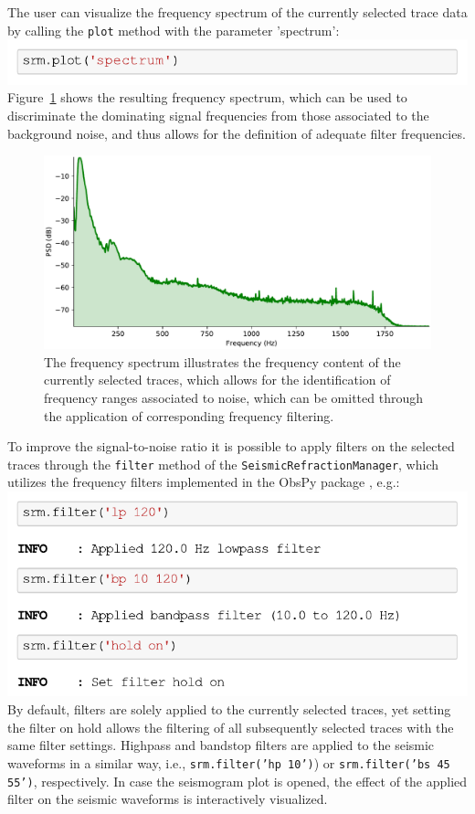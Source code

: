 \documentclass[a4paper,fleqn]{cas-sc}
\begin{document}
The user can visualize the frequency spectrum of the currently selected trace data by calling the \texttt{plot} method with the parameter 'spectrum':
\newline
\includegraphics[width=.5\textwidth]{./figures/plot_spectrum.pdf}
\newline
Figure~\ref{fig:spectrum} shows the resulting frequency spectrum, which can be used to discriminate the dominating signal frequencies from those associated to the background noise, and thus allows for the definition of adequate filter frequencies.
\begin{figure}
	\centering
	\includegraphics[width=.75\textwidth]{figures/spectrum.pdf}
	\caption{The frequency spectrum illustrates the frequency content of the currently selected traces, which allows for the identification of frequency ranges associated to noise, which can be omitted through the application of corresponding frequency filtering.}
	\label{fig:spectrum}
\end{figure}
To improve the signal-to-noise ratio it is possible to apply filters on the selected traces through the \texttt{filter} method of the \texttt{SeismicRefractionManager}, which utilizes the frequency filters implemented in the ObsPy package \citep[lowpass, highpass, bandpass and bandstop;][]{beyreuther2010}, e.g.:
\newline
\includegraphics[width=.5\textwidth]{./figures/filter.pdf}
\newline
By default, filters are solely applied to the currently selected traces, yet setting the filter on hold allows the filtering of all subsequently selected traces with the same filter settings.
Highpass and bandstop filters are applied to the seismic waveforms in a similar way, i.e., \texttt{srm.filter('hp 10')}) or \texttt{srm.filter('bs 45 55')}, respectively. In case the seismogram plot is opened, the effect of the applied filter on the seismic waveforms is interactively visualized.
\end{document}
